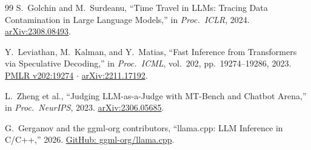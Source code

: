 \documentclass[10pt,a4paper]{article}
\begin{document}
\begin{thebibliography}{99}
S.~Golchin and M.~Surdeanu, ``Time Travel in LLMs: Tracing Data Contamination in Large Language Models,'' in \textit{Proc.\ ICLR}, 2024. \href{https://arxiv.org/abs/2308.08493}{arXiv:2308.08493}.

Y.~Leviathan, M.~Kalman, and Y.~Matias, ``Fast Inference from Transformers via Speculative Decoding,'' in \textit{Proc.\ ICML}, vol.~202, pp.~19274--19286, 2023. \href{https://proceedings.mlr.press/v202/leviathan23a.html}{PMLR v202:19274} $\cdot$ \href{https://arxiv.org/abs/2211.17192}{arXiv:2211.17192}.

L.~Zheng et al., ``Judging LLM-as-a-Judge with MT-Bench and Chatbot Arena,'' in \textit{Proc.\ NeurIPS}, 2023. \href{https://arxiv.org/abs/2306.05685}{arXiv:2306.05685}.

G.~Gerganov and the ggml-org contributors, ``llama.cpp: LLM Inference in C/C++,'' 2026. \href{https://github.com/ggml-org/llama.cpp}{GitHub: ggml-org/llama.cpp}.

\end{thebibliography}
\end{document}
